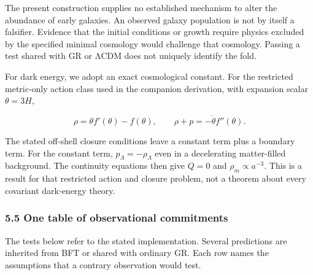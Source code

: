 \documentclass[
]{article}
\begin{document}
The present construction supplies no established mechanism to alter the
abundance of early galaxies. An observed galaxy population is not by
itself a falsifier. Evidence that the initial conditions or growth
require physics excluded by the specified minimal cosmology would
challenge that cosmology. Passing a test shared with GR or ΛCDM does not
uniquely identify the fold.

For dark energy, we adopt an exact cosmological constant. For the
restricted metric-only action class used in the companion derivation,
with expansion scalar \(\theta=3H\),

\[
\rho=\theta f'(\theta)-f(\theta),\qquad
\rho+p=-\dot\theta f''(\theta).
\]

The stated off-shell closure conditions leave a constant term plus a
boundary term. For the constant term, \(p_\Lambda=-\rho_\Lambda\) even
in a decelerating matter-filled background. The continuity equations
then give \(Q=0\) and \(\rho_m\propto a^{-3}\). This is a result for
that restricted action and closure problem, not a theorem about every
covariant dark-energy theory.

\subsubsection{5.5 One table of observational
commitments}\label{one-table-of-observational-commitments}

The tests below refer to the stated implementation. Several predictions
are inherited from BFT or shared with ordinary GR. Each row names the
assumptions that a contrary observation would test.
\end{document}
